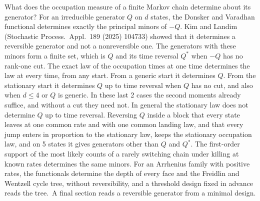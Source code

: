 What does the occupation measure of a finite Markov chain determine about its generator? For an
irreducible generator $Q$ on $d$ states, the Donsker and Varadhan functional determines exactly
the principal minors of $-Q$. Kim and Landim (Stochastic Process.\ Appl.\ 189 (2025) 104733)
showed that it determines a reversible generator and not a nonreversible one. The generators with
these minors form a finite set, which is $Q$ and its time reversal $Q^*$ when $-Q$ has no rank-one
cut. The exact law of the occupation times at one time determines the law at every time, from any
start. From a generic start it determines $Q$. From the stationary start it determines $Q$ up to
time reversal when $Q$ has no cut, and also when $d\le4$ or $Q$ is generic. In these last 2 cases
the second moments already suffice, and without a cut they need not. In general the stationary
law does not determine $Q$ up to time reversal. Reversing $Q$ inside a block that every state
leaves at one common rate and with one common landing law, and that every jump enters in
proportion to the stationary law, keeps the stationary occupation law, and on 5 states it gives
generators other than $Q$ and $Q^*$. The first-order
support of the most likely counts of a rarely switching chain under killing at known rates
determines the same minors. For an Arrhenius family with positive
rates, the functionals determine the depth of every face and the Freidlin and Wentzell cycle tree,
without reversibility, and a threshold design fixed in advance reads the tree.\ifarxivbuild\ A
final section reads a reversible generator from a minimal design.\fi

